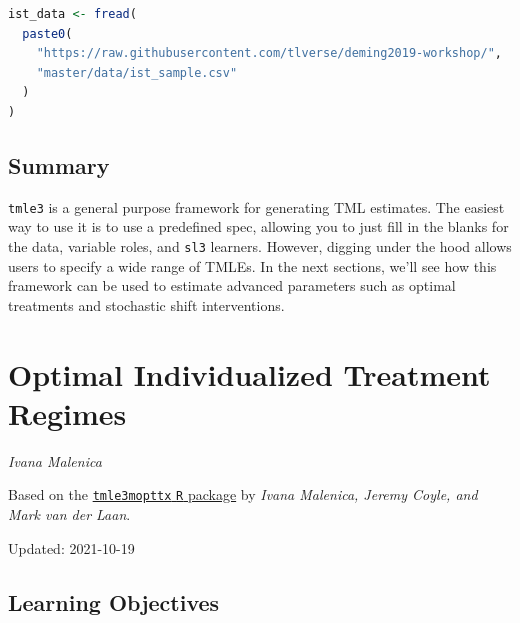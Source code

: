 \documentclass[
  12pt, krantz2,
]{krantz}
\newcommand{\passthrough}[1]{#1}
\theoremstyle{definition}
\theoremstyle{definition}
\theoremstyle{definition}
\newcommand{\1}{\mathbbm{1}}
\begin{document}
\begin{lstlisting}[language=R]
ist_data <- fread(
  paste0(
    "https://raw.githubusercontent.com/tlverse/deming2019-workshop/",
    "master/data/ist_sample.csv"
  )
)
\end{lstlisting}

\hypertarget{summary}{%
\section{Summary}\label{summary}}

\passthrough{\lstinline!tmle3!} is a general purpose framework for generating TML estimates. The easiest
way to use it is to use a predefined spec, allowing you to just fill in the
blanks for the data, variable roles, and \passthrough{\lstinline!sl3!} learners. However, digging under
the hood allows users to specify a wide range of TMLEs. In the next sections,
we'll see how this framework can be used to estimate advanced parameters such as
optimal treatments and stochastic shift interventions.

\hypertarget{optimal-individualized-treatment-regimes}{%
\chapter{Optimal Individualized Treatment Regimes}\label{optimal-individualized-treatment-regimes}}

\emph{Ivana Malenica}

Based on the \href{https://github.com/tlverse/tmle3mopttx}{\passthrough{\lstinline!tmle3mopttx!} \passthrough{\lstinline!R!} package}
by \emph{Ivana Malenica, Jeremy Coyle, and Mark van der Laan}.

Updated: 2021-10-19

\hypertarget{learning-objectives-1}{%
\section{Learning Objectives}\label{learning-objectives-1}}
\end{document}
